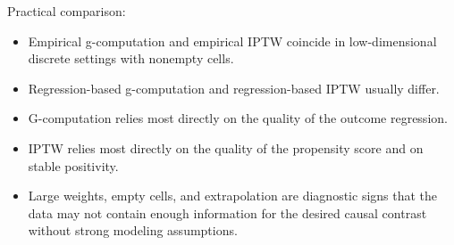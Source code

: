 \begin{estimationbox}
Practical comparison:
\begin{itemize}
\item Empirical g-computation and empirical IPTW coincide in low-dimensional
discrete settings with nonempty cells.
\item Regression-based g-computation and regression-based IPTW usually differ.
\item G-computation relies most directly on the quality of the outcome regression.
\item IPTW relies most directly on the quality of the propensity score and on stable
positivity.
\item Large weights, empty cells, and extrapolation are diagnostic signs that the
data may not contain enough information for the desired causal contrast without
strong modeling assumptions.
\end{itemize}
\end{estimationbox}
